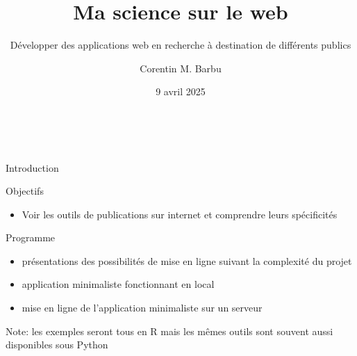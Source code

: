 \documentclass[pdftex,xcolor={table}]{beamer} %
\title[Ma science sur le web]{
Ma science sur le web
}
\subtitle{
Développer des applications web en recherche à destination de différents publics
}
\author[Corentin Barbu]{Corentin M. Barbu}
\date{9 avril 2025}
\institute[ABIES]{INRAE et Ecole Doctorale ABIES (réseau ADUM)}
\begin{document}
  \begin{frame}
    \titlepage
    \vfill
    ~
  \end{frame}

  \begin{frame}{Introduction}
    \begin{block}{Objectifs}
      \begin{itemize}
        \item Voir les outils de publications sur internet et comprendre leurs spécificités
      \end{itemize}
    \end{block}
    \begin{block}{Programme}
      \begin{itemize}
        \item présentations des possibilités de mise en ligne suivant la complexité du projet 
          \item application minimaliste fonctionnant en local
          \item mise en ligne de l'application minimaliste sur un serveur
        \end{itemize}
        Note: les exemples seront tous en R mais les mêmes outils sont souvent aussi disponibles sous Python
      \end{block}

  \end{frame}
\end{document}
